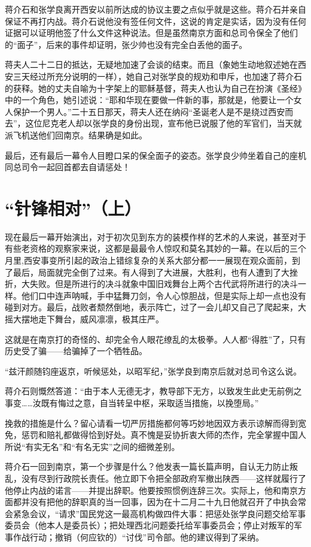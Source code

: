 \documentclass[10pt]{book}
\begin{document}
蒋介石和张学良离开西安以前所达成的协议主要之点似乎就是这些。蒋介石并亲自保证不再打内战。蒋介石说他没有签任何文件，这说的肯定是实话，因为没有任何证据可以证明他签了什么文件这种说法。但是虽然南京方面和总司令保全了他们的“面子”，后来的事件却证明，张少帅也没有完全白丢他的面子。

蒋夫人二十二日的抵达，无疑地加速了会谈的结束。而且（象她生动地叙述她在西安三天经过所充分说明的一样），她自己对张学良的规劝和申斥，也加速了蒋介石的获释。她的丈夫自喻为十字架上的耶稣基督，蒋夫人也认为自己在扮演《圣经》中的一个角色，她引述说：“耶和华现在要做一件新的事，那就是，他要让一个女人保护一个男人。”二十五日那天，蒋夫人还在纳闷“圣诞老人是不是绕过西安而去”，这位尼克老人却以张学良的身份出现，宣布他已说服了他的军官们，当天就派飞机送他们回南京。结果确是如此。

最后，还有最后一幕令人目瞪口呆的保全面子的姿态。张学良少帅坐着自己的座机同总司令一起回首都去自请惩处！



\section{“针锋相对”（上）}

现在最后一幕开始演出，对于初次见到东方的装模作样的艺术的人来说，甚至对于有些老资格的观察家来说，这都是最最令人惊叹和莫名其妙的一幕。在以后的三个月里,西安事变所引起的政治上错综复杂的关系大部分都一一展现在观众面前，到了最后，局面就完全倒了过来。有人得到了大进展，大胜利，也有人遭到了大挫折，大失败。但是所进行的决斗就象中国旧戏舞台上两个古代武将所进行的决斗一样。他们口中连声呐喊，手中猛舞刀剑，令人心惊胆战，但是实际上却一点也没有碰到对方。最后，战败者颓然倒地，表示阵亡，过了一会儿却又自己了爬起来，大摇大摆地走下舞台，威风凛凛，极其庄严。

这就是在南京打的奇怪的、却完全令人眼花缭乱的太极拳。人人都“得胜”了，只有历史受了骗——给骗掉了一个牺牲品。

“兹汗颜随钧座返京，听候惩处，以昭军纪，”张学良到南京后就对总司令这么说。

蒋介石则慨然答道：“由于本人无德无才，教导部下无方，以致发生此史无前例之事变……汝既有悔过之意，自当转呈中枢，采取适当措施，以挽堕局。”

挽救的措施是什么？留心请看一切严厉措施都何等巧妙地因双方表示谅解而得到宽免，惩罚和赔礼都做得恰到好处。真不愧是妥协折衷大师的杰作，完全掌握中国人所说“有实无名”和“有名无实”之间的细微差别。

蒋介石一回到南京，第一个步骤是什么？他发表一篇长篇声明，自认无力防止叛乱，没有尽到行政院长责任。他立即下令把全部政府军撤出陕西——这样就履行了他停止内战的诺言——并提出辞职。他要按照惯例连辞三次。实际上，他和南京方面都并没有把他的辞职真的当一回事，因为在十二月二十九日他就召开了中执会常会紧急会议，“请求”国民党这一最高机构做四件大事：把惩处张学良问题交给军事委员会（他本人是委员长）；把处理西北问题委托给军事委员会；停止对叛军的军事作战行动；撤销（何应钦的）“讨伐”司令部。他的建议得到了采纳。
\end{document}
